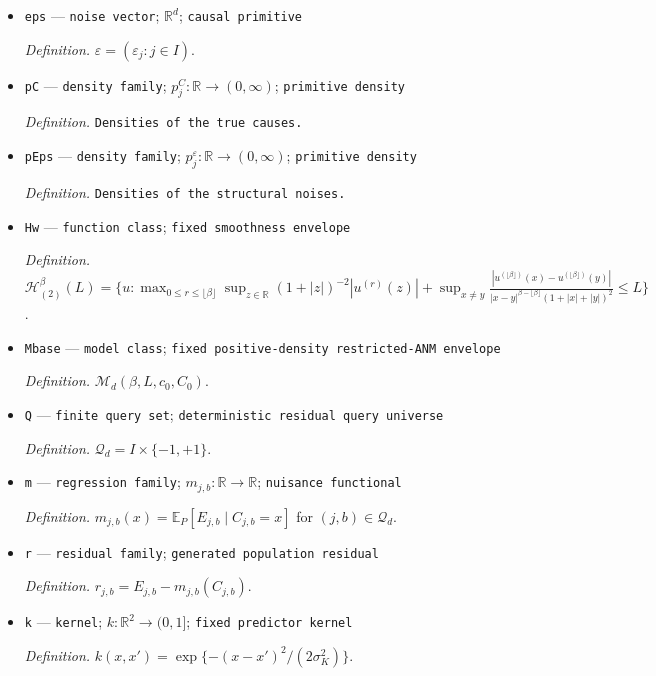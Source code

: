 \documentclass{article}
\begin{document}
\begin{itemize}
  \item \texttt{eps} --- \texttt{noise vector}; \(\mathbb R^d\); \texttt{causal primitive}
  \par\smallskip\noindent\emph{Definition.} \(\varepsilon=(\varepsilon_j:j\in I)\).
  \item \texttt{pC} --- \texttt{density family}; \(p^C_j:\mathbb R\to(0,\infty)\); \texttt{primitive density}
  \par\smallskip\noindent\emph{Definition.} \texttt{Densities of the true causes.}
  \item \texttt{pEps} --- \texttt{density family}; \(p^\varepsilon_j:\mathbb R\to(0,\infty)\); \texttt{primitive density}
  \par\smallskip\noindent\emph{Definition.} \texttt{Densities of the structural noises.}
  \item \texttt{Hw} --- \texttt{function class}; \texttt{fixed smoothness envelope}
  \par\smallskip\noindent\emph{Definition.} \(\mathcal H_{(2)}^\beta(L)=\{u:\max_{0\le r\le\lfloor\beta\rfloor}\sup_{z\in\mathbb R}(1+|z|)^{-2}|u^{(r)}(z)|+\sup_{x\ne y}\frac{|u^{(\lfloor\beta\rfloor)}(x)-u^{(\lfloor\beta\rfloor)}(y)|}{|x-y|^{\beta-\lfloor\beta\rfloor}(1+|x|+|y|)^2}\le L\}\).
  \item \texttt{Mbase} --- \texttt{model class}; \texttt{fixed positive-\allowbreak{}density restricted-\allowbreak{}ANM envelope}
  \par\smallskip\noindent\emph{Definition.} \(\mathcal M_d(\beta,L,c_0,C_0)\).
  \item \texttt{Q} --- \texttt{finite query set}; \texttt{deterministic residual query universe}
  \par\smallskip\noindent\emph{Definition.} \(\mathcal Q_d=I\times\{-1,+1\}\).
  \item \texttt{m} --- \texttt{regression family}; \(m_{j,b}:\mathbb R\to\mathbb R\); \texttt{nuisance functional}
  \par\smallskip\noindent\emph{Definition.} \(m_{j,b}(x)=\mathbb E_P[E_{j,b}\mid C_{j,b}=x]\) for \((j,b)\in\mathcal Q_d\).
  \item \texttt{r} --- \texttt{residual family}; \texttt{generated population residual}
  \par\smallskip\noindent\emph{Definition.} \(r_{j,b}=E_{j,b}-m_{j,b}(C_{j,b})\).
  \item \texttt{k} --- \texttt{kernel}; \(k:\mathbb R^2\to(0,1]\); \texttt{fixed predictor kernel}
  \par\smallskip\noindent\emph{Definition.} \(k(x,x')=\exp\{-(x-x')^2/(2\sigma_K^2)\}\).

\end{itemize}
\end{document}
